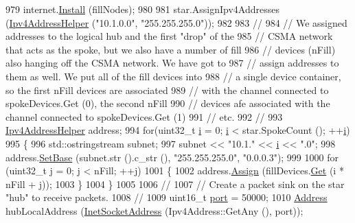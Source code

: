 \begin{DoxyCode}
979   internet.\hyperlink{classns3_1_1InternetStackHelper_a6645b412f31283d2d9bc3d8a95cebbc0}{Install} (fillNodes);
980 
981   star.AssignIpv4Addresses (\hyperlink{classns3_1_1Ipv4AddressHelper}{Ipv4AddressHelper} (\textcolor{stringliteral}{"10.1.0.0"}, \textcolor{stringliteral}{"255.255.255.0"}));
982 
983   \textcolor{comment}{//}
984   \textcolor{comment}{// We assigned addresses to the logical hub and the first "drop" of the }
985   \textcolor{comment}{// CSMA network that acts as the spoke, but we also have a number of fill}
986   \textcolor{comment}{// devices (nFill) also hanging off the CSMA network.  We have got to }
987   \textcolor{comment}{// assign addresses to them as well.  We put all of the fill devices into}
988   \textcolor{comment}{// a single device container, so the first nFill devices are associated}
989   \textcolor{comment}{// with the channel connected to spokeDevices.Get (0), the second nFill}
990   \textcolor{comment}{// devices afe associated with the channel connected to spokeDevices.Get (1)}
991   \textcolor{comment}{// etc.}
992   \textcolor{comment}{//}
993   \hyperlink{classns3_1_1Ipv4AddressHelper}{Ipv4AddressHelper} address;
994   \textcolor{keywordflow}{for}(uint32\_t \hyperlink{bernuolliDistribution_8m_a6f6ccfcf58b31cb6412107d9d5281426}{i} = 0; \hyperlink{bernuolliDistribution_8m_a6f6ccfcf58b31cb6412107d9d5281426}{i} < star.SpokeCount (); ++\hyperlink{bernuolliDistribution_8m_a6f6ccfcf58b31cb6412107d9d5281426}{i})
995     \{
996       std::ostringstream subnet;
997       subnet << \textcolor{stringliteral}{"10.1."} << \hyperlink{bernuolliDistribution_8m_a6f6ccfcf58b31cb6412107d9d5281426}{i} << \textcolor{stringliteral}{".0"};
998       address.\hyperlink{classns3_1_1Ipv4AddressHelper_acf7b16dd25bac67e00f5e25f90a9a035}{SetBase} (subnet.str ().c\_str (), \textcolor{stringliteral}{"255.255.255.0"}, \textcolor{stringliteral}{"0.0.0.3"});
999 
1000       \textcolor{keywordflow}{for} (uint32\_t j = 0; j < nFill; ++j)
1001         \{
1002           address.\hyperlink{classns3_1_1Ipv4AddressHelper_af8e7f4a1a7e74c00014a1eac445a27af}{Assign} (fillDevices.\hyperlink{classns3_1_1NetDeviceContainer_a677d62594b5c9d2dea155cc5045f4d0b}{Get} (i * nFill + j));
1003         \}
1004     \}
1005 
1006   \textcolor{comment}{//}
1007   \textcolor{comment}{// Create a packet sink on the star "hub" to receive packets.}
1008   \textcolor{comment}{// }
1009   uint16\_t \hyperlink{dsdv-manet_8cc_a8e0798404bf2cf5dabb84c5ba9a4f236}{port} = 50000;
1010   \hyperlink{classns3_1_1Address}{Address} hubLocalAddress (\hyperlink{classns3_1_1InetSocketAddress}{InetSocketAddress} (Ipv4Address::GetAny (), port));

\end{DoxyCode}
